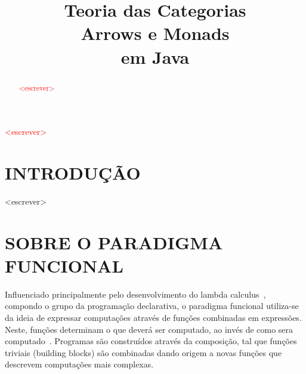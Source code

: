 \documentclass[10pt, conference]{IEEEtran}
\begin{document}

\title { 
	Teoria das Categorias \\
	Arrows e Monads \\
	em Java 
}

\author{


	\and	
	
}
					  
\maketitle

\thispagestyle{plain}
\pagestyle{plain}

\begin{abstract}

\textcolor{red}{<escrever>}

\end{abstract}

\begin{IEEEkeywords}

\textcolor{red}{<escrever>}

\end{IEEEkeywords}

\section{INTRODUÇÃO}
\label{sec:intro}

<escrever>

\section{SOBRE O PARADIGMA FUNCIONAL}
\label{sec:func-para}
Influenciado principalmente pelo desenvolvimento do lambda calculus~\cite{hudak1989conception}, compondo o grupo da programação declarativa, o paradigma funcional utiliza-se da ideia de expressar computações através de funções combinadas em expressões. Neste, funções determinam o que deverá ser computado, ao invés de como sera computado~\cite{louden2011programming}. Programas são construídos através da composição, tal que funções triviais (building blocks) são combinadas dando origem a novas funções que descrevem computações mais complexas.
\end{document}
